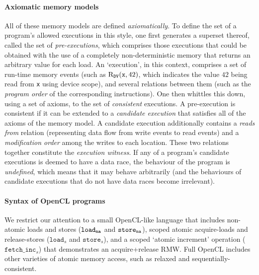 \documentclass[svgnames,10pt]{sigplanconf}
\theoremstyle{definition}
\newcommand\na{{\tt na}}
\newcommand\sdv{{\tt DV}}
\newcommand\evR{{\rm R}}
\begin{document}
\paragraph{Axiomatic memory models} All of these memory models are
defined \emph{axiomatically}. To define the set of a program's allowed
executions in this style, one first generates a superset thereof,
called the set of \emph{pre-executions}, which comprises those
executions that could be obtained with the use of a completely
non-deterministic memory that returns an arbitrary value for each
load. An `execution', in this context, comprises a set of run-time
memory events (such as $\evR_\sdv(\texttt{x},42)$, which indicates the
value $42$ being read from \texttt{x} using device scope), and several relations between
them (such as the \emph{program order} of the corresponding
instructions). One then whittles this down, using a set of axioms, to
the set of \emph{consistent} executions. A pre-execution is consistent
if it can be extended to a \emph{candidate
execution}\label{lab:candidate} that satisfies all of the axioms of
the memory model. A candidate execution additionally contains a
\emph{reads from} relation (representing data flow from write events
to read events) and a \emph{modification order} among the writes to
each location. These two relations together constitute the
\emph{execution witness}. If any of a program's candidate executions
is deemed to have a data race, the behaviour of the program is
\emph{undefined}, which means that it may behave arbitrarily (and the
behaviours of candidate executions that do not have data races become
irrelevant).

\paragraph{Syntax of OpenCL programs}
We restrict our attention to a small OpenCL-like language that
includes non-atomic loads and stores ($\texttt{load}_\na$ and
$\texttt{store}_\na$), scoped atomic acquire-loads and release-stores
($\texttt{load}_s$ and $\texttt{store}_s$), and a scoped `atomic
increment' operation ($\texttt{fetch\_inc}_s$) that demonstrates an
acquire+release RMW. Full OpenCL includes other varieties of atomic
memory access, such as relaxed and sequentially-consistent.
\end{document}
